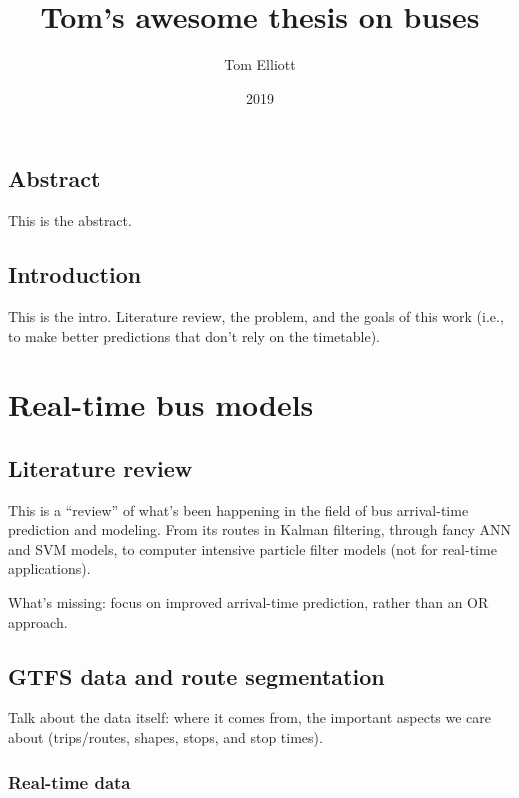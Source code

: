 \documentclass[english]{MastersDoctoralThesis}\usepackage[]{graphicx}\usepackage[]{color}
\title{Tom's awesome thesis on buses}
\author{Tom Elliott}
\date{2019}
\begin{document}
\maketitle

\tableofcontents
\tabularnewline

\frontmatter

\chapter*{Abstract}

This is the abstract.

\mainmatter



\chapter{Introduction}

This is the intro. Literature review, the problem,
and the goals of this work (i.e., to make better predictions
that don't rely on the timetable).

\part{Real-time bus models}



\chapter{Literature review}

This is a ``review'' of what's been happening in the field of
bus arrival-time prediction and modeling.
From its routes in Kalman filtering,
through fancy ANN and SVM models,
to computer intensive particle filter models
(not for real-time applications).

What's missing: focus on improved arrival-time prediction,
rather than an OR approach.



\chapter{GTFS data and route segmentation}

Talk about the data itself: where it comes from,
the important aspects we care about
(trips/routes, shapes, stops, and stop times).


\section{Real-time data}
\end{document}
